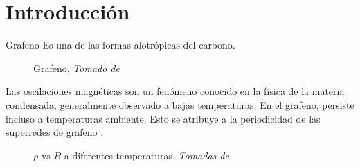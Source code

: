 \section{Introducción}
\justifying

\begin{frame}{Grafeno}
	Es una de las formas alotrópicas del carbono.

	\begin{figure}
		\caption{Grafeno, \textit{Tomado de }\cite{Neto2006} }
	\end{figure}
\end{frame}

\begin{frame}
	Las oscilaciones magnéticas son un fenómeno conocido en la física de la materia condensada, generalmente observado a bajas temperaturas.
	En el grafeno, persiste incluso a temperaturas ambiente. Esto se atribuye a la periodicidad de las superredes de grafeno \cite{Kumar2017}.

	\begin{figure}
	\caption{$\rho$ vs $B$ a diferentes temperaturas. \textit{Tomadas de \cite{Kumar2017}}}
	\end{figure}
\end{frame}

